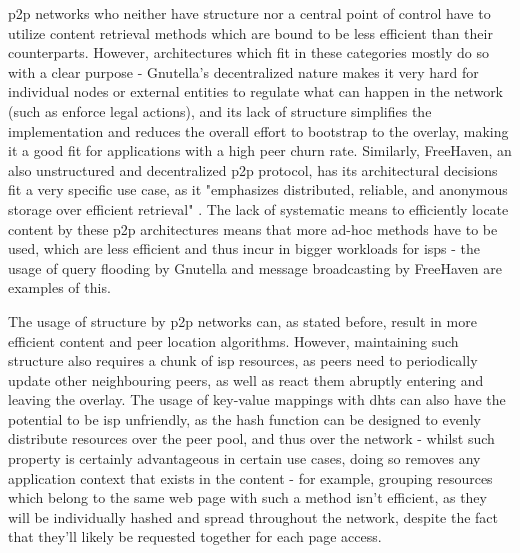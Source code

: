     \gls{p2p} networks who neither have structure nor a central point of control have to utilize content retrieval methods which are bound to be less efficient than their counterparts.
    However, architectures which fit in these categories mostly do so with a clear purpose - Gnutella's decentralized nature makes it very hard for individual nodes or external entities to regulate what can happen in the network (such as enforce legal actions), and its lack of structure simplifies the implementation and reduces the overall effort to bootstrap to the overlay, making it a good fit for applications with a high peer churn rate.
    Similarly, FreeHaven, an also unstructured and decentralized \gls{p2p} protocol, has its architectural decisions fit a very specific use case, as it "emphasizes distributed, reliable, and anonymous storage over efficient retrieval" \cite{freehaven}.
    The lack of systematic means to efficiently locate content by these \gls{p2p} architectures means that more ad-hoc methods have to be used, which are less efficient and thus incur in bigger workloads for \glspl{isp} - the usage of query flooding by Gnutella and message broadcasting by FreeHaven are examples of this.

    The usage of structure by \gls{p2p} networks can, as stated before, result in more efficient content and peer location algorithms.
    However, maintaining such structure also requires a chunk of \gls{isp} resources, as peers need to periodically update other neighbouring peers, as well as react them abruptly entering and leaving the overlay.
    The usage of key-value mappings with \glspl{dht} can also have the potential to be \gls{isp} unfriendly, as the hash function can be designed to evenly distribute resources over the peer pool, and thus over the network - whilst such property is certainly advantageous in certain use cases, doing so removes any application context that exists in the content - for example, grouping resources which belong to the same web page with such a method isn't efficient, as they will be individually hashed and spread throughout the network, despite the fact that they'll likely be requested together for each page access.

